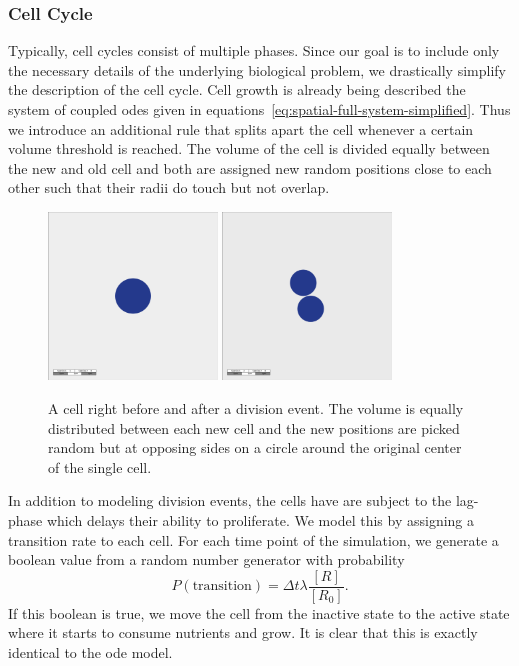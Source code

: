 \documentclass[10pt,A4paper]{article}
\numberwithin{equation}{section}
\begin{document}
\subsubsection{Cell Cycle}
Typically, cell cycles consist of multiple phases.
Since our goal is to include only the necessary details of the underlying biological problem, we drastically simplify the description of the cell cycle.
Cell growth is already being described the system of coupled \acp{ode} given in equations~\eqref{eq:spatial-full-system-simplified}.
Thus we introduce an additional rule that splits apart the cell whenever a certain volume threshold is reached.
The volume of the cell is divided equally between the new and old cell and both are assigned new random positions close to each other such that their radii do touch but not overlap.
\begin{figure}
    \begin{center}
    \includegraphics[width=0.4\textwidth]{Figures/snapshot-2-cells-before-division.png}
    \includegraphics[width=0.4\textwidth]{Figures/snapshot-2-cells-after-division.png}
    \caption{
        A cell right before and after a division event.
        The volume is equally distributed between each new cell and the new positions are picked random but at opposing sides on a circle around the original center of the single cell.
    }
    \label{fig:spatial-cell-division-example}
    \end{center}
\end{figure}
In addition to modeling division events, the cells have are subject to the lag-phase which delays their ability to proliferate.
We model this by assigning a transition rate to each cell.
For each time point of the simulation, we generate a boolean value from a random number generator with probability
\begin{equation}
    P(\text{transition}) = \Delta t \lambda \frac{[R]}{[R_0]}.
\end{equation}
If this boolean is true, we move the cell from the inactive state to the active state where it starts to consume nutrients and grow.
It is clear that this is exactly identical to the \ac{ode} model.
%
%
%
\end{document}
